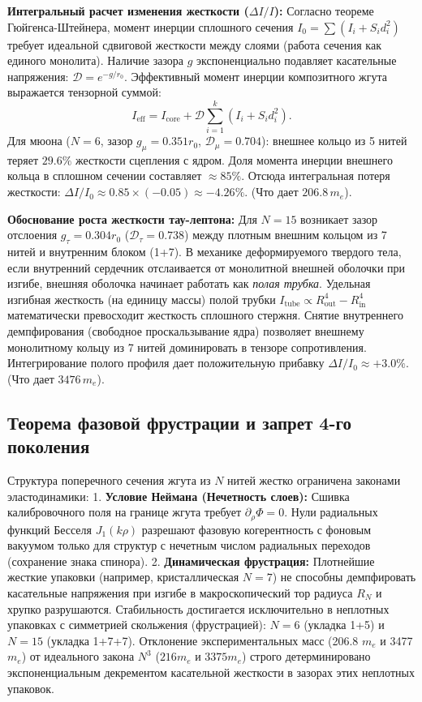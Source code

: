 \documentclass[12pt,a4paper]{article}
\begin{document}
\textbf{Интегральный расчет изменения жесткости ($\Delta I/I$):}
Согласно теореме Гюйгенса-Штейнера, момент инерции сплошного сечения $I_0 = \sum (I_i + S_i d_i^2)$ требует идеальной сдвиговой жесткости между слоями (работа сечения как единого монолита). Наличие зазора $g$ экспоненциально подавляет касательные напряжения: $\mathcal{D} = e^{-g/r_0}$. Эффективный момент инерции композитного жгута выражается тензорной суммой:
\begin{equation}
I_{\text{eff}} = I_{\text{core}} + \mathcal{D} \sum_{i=1}^{k} \left( I_i + S_i d_i^2 \right).
\end{equation}
Для мюона ($N=6$, зазор $g_\mu = 0.351 r_0$, $\mathcal{D}_\mu = 0.704$): внешнее кольцо из 5 нитей теряет $29.6\%$ жесткости сцепления с ядром. Доля момента инерции внешнего кольца в сплошном сечении составляет $\approx 85\%$. Отсюда интегральная потеря жесткости: $\Delta I / I_0 \approx 0.85 \times (-0.05) \approx -4.26\%$. (Что дает $206.8 \, m_e$).

\textbf{Обоснование роста жесткости тау-лептона:}
Для $N=15$ возникает зазор отслоения $g_\tau = 0.304 r_0$ ($\mathcal{D}_\tau = 0.738$) между плотным внешним кольцом из 7 нитей и внутренним блоком (1+7). В механике деформируемого твердого тела, если внутренний сердечник отслаивается от монолитной внешней оболочки при изгибе, внешняя оболочка начинает работать как \textit{полая трубка}. 
Удельная изгибная жесткость (на единицу массы) полой трубки $I_{\text{tube}} \propto R_{\text{out}}^4 - R_{\text{in}}^4$ математически превосходит жесткость сплошного стержня. Снятие внутреннего демпфирования (свободное проскальзывание ядра) позволяет внешнему монолитному кольцу из 7 нитей доминировать в тензоре сопротивления. Интегрирование полого профиля дает положительную прибавку $\Delta I / I_0 \approx +3.0\%$. (Что дает $3476 \, m_e$).
	
\subsection{Теорема фазовой фрустрации и запрет 4-го поколения}
Структура поперечного сечения жгута из $N$ нитей жестко ограничена законами эластодинамики:
1. \textbf{Условие Неймана (Нечетность слоев):} Сшивка калибровочного поля на границе жгута требует $\partial_\rho \Phi = 0$. Нули радиальных функций Бесселя $J_1(k\rho)$ разрешают фазовую когерентность с фоновым вакуумом только для структур с нечетным числом радиальных переходов (сохранение знака спинора).
2. \textbf{Динамическая фрустрация:} Плотнейшие жесткие упаковки (например, кристаллическая $N=7$) не способны демпфировать касательные напряжения при изгибе в макроскопический тор радиуса $R_N$ и хрупко разрушаются. Стабильность достигается исключительно в неплотных упаковках с симметрией скольжения (фрустрацией): $N=6$ (укладка 1+5) и $N=15$ (укладка 1+7+7).
Отклонение экспериментальных масс (206.8 $m_e$ и 3477 $m_e$) от идеального закона $N^3$ ($216 m_e$ и $3375 m_e$) строго детерминировано экспоненциальным декрементом касательной жесткости в зазорах этих неплотных упаковок.
	
\end{document}

